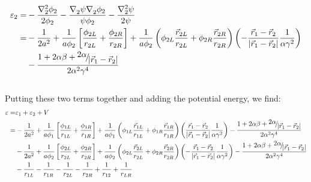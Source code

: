 \begin{align}
{\varepsilon _2} =&  - \frac{{\nabla _2^2{\phi _2}}}{{2{\phi _2}}} - \frac{{\nabla _2^{}\psi \nabla _2^{}{\phi _2}}}{{\psi {\phi _2}}} - \frac{{\nabla _2^2\psi }}{{2\psi }}\nonumber\\
 =&  - \frac{1}{{2{a^2}}} + \frac{1}{{a{\phi _2}}}\left[ {\frac{{{\phi _{2L}}}}{{{r_{2L}}}} + \frac{{{\phi _{2R}}}}{{{r_{2R}}}}} \right] + \frac{1}{{a{\phi _2}}}\left( {{\phi _{2L}}\frac{{{{\vec r}_{2L}}}}{{{r_{2L}}}} + {\phi _{2R}}\frac{{{{\vec r}_{2R}}}}{{{r_{2R}}}}} \right)\left( { - \frac{{{{\vec r}_1} - {{\vec r}_2}}}{{\left| {{{\vec r}_1} - {{\vec r}_2}} \right|}}\frac{1}{{\alpha {\gamma ^2}}}} \right)\nonumber\\ &- \frac{{1 + 2\alpha \beta  + {\raise0.7ex\hbox{${2\alpha }$} \!\mathord{\left/
 {\vphantom {{2\alpha } {\left| {{{\vec r}_1} - {{\vec r}_2}} \right|}}}\right.\kern-\nulldelimiterspace}
\!\lower0.7ex\hbox{${\left| {{{\vec r}_1} - {{\vec r}_2}} \right|}$}}}}{{2{\alpha ^2}{\gamma ^4}}}
\end{align}\\
Putting these two terms together and adding the potential energy, we find:
\begin{align}
\varepsilon  =& {\varepsilon _1} + {\varepsilon _2} + V\nonumber\\
 =&  - \frac{1}{{2{a^2}}} + \frac{1}{{a{\phi _1}}}\left[ {\frac{{{\phi _{1L}}}}{{{r_{1L}}}} + \frac{{{\phi _{1R}}}}{{{r_{1R}}}}} \right] + \frac{1}{{a{\phi _1}}}\left( {{\phi _{1L}}\frac{{{{\vec r}_{1L}}}}{{{r_{1L}}}} + {\phi _{1R}}\frac{{{{\vec r}_{1R}}}}{{{r_{1R}}}}} \right)\left( {\frac{{{{\vec r}_1} - {{\vec r}_2}}}{{\left| {{{\vec r}_1} - {{\vec r}_2}} \right|}}\frac{1}{{\alpha {\gamma ^2}}}} \right) - \frac{{1 + 2\alpha \beta  + {\raise0.7ex\hbox{${2\alpha }$} \!\mathord{\left/
 {\vphantom {{2\alpha } {\left| {{{\vec r}_1} - {{\vec r}_2}} \right|}}}\right.\kern-\nulldelimiterspace}
\!\lower0.7ex\hbox{${\left| {{{\vec r}_1} - {{\vec r}_2}} \right|}$}}}}{{2{\alpha ^2}{\gamma ^4}}}\nonumber\\
 &- \frac{1}{{2{a^2}}} + \frac{1}{{a{\phi _2}}}\left[ {\frac{{{\phi _{2L}}}}{{{r_{2L}}}} + \frac{{{\phi _{2R}}}}{{{r_{2R}}}}} \right] + \frac{1}{{a{\phi _2}}}\left( {{\phi _{2L}}\frac{{{{\vec r}_{2L}}}}{{{r_{2L}}}} + {\phi _{2R}}\frac{{{{\vec r}_{2R}}}}{{{r_{2R}}}}} \right)\left( { - \frac{{{{\vec r}_1} - {{\vec r}_2}}}{{\left| {{{\vec r}_1} - {{\vec r}_2}} \right|}}\frac{1}{{\alpha {\gamma ^2}}}} \right) - \frac{{1 + 2\alpha \beta  + {\raise0.7ex\hbox{${2\alpha }$} \!\mathord{\left/
 {\vphantom {{2\alpha } {\left| {{{\vec r}_1} - {{\vec r}_2}} \right|}}}\right.\kern-\nulldelimiterspace}
\!\lower0.7ex\hbox{${\left| {{{\vec r}_1} - {{\vec r}_2}} \right|}$}}}}{{2{\alpha ^2}{\gamma ^4}}}\nonumber\\
 &- \frac{1}{{{r_{1L}}}} - \frac{1}{{{r_{1R}}}} - \frac{1}{{{r_{2L}}}} - \frac{1}{{{r_{2R}}}} + \frac{1}{{{r_{12}}}} + \frac{1}{{{r_{LR}}}}
\end{align}\\
